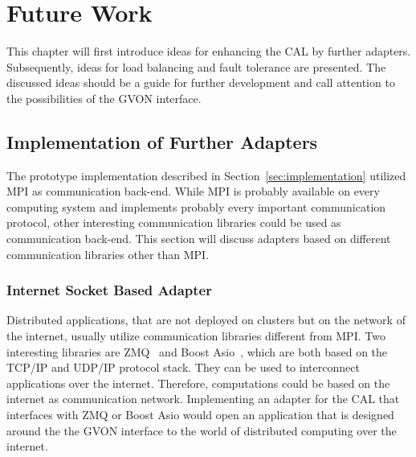 \chapter{Future Work}
\label{sec:futurework}

This chapter will first introduce ideas for enhancing the CAL by
further adapters. Subsequently, ideas for load balancing and fault
tolerance are presented. The discussed ideas should be a guide for
further development and call attention to the possibilities of the
GVON interface.

\section{Implementation of Further Adapters}

The prototype implementation described in
Section~\ref{sec:implementation} utilized MPI as communication
back-end. While MPI is probably available on every computing system
and implements probably every important communication protocol, other
interesting communication libraries could be used as communication
back-end.  This section will discuss adapters based on different
communication libraries other than MPI.

\subsection*{Internet Socket Based Adapter}

Distributed applications, that are not deployed on clusters but on the
network of the internet, usually utilize communication libraries
different from MPI. Two interesting libraries are ZMQ~\cite{ref:zmq}
and Boost Asio~\cite{ref:boost_asio}, which are both based on the
TCP/IP and UDP/IP protocol stack. They can be used to interconnect
applications over the internet. Therefore, computations could be based
on the internet as communication network. Implementing an adapter for
the CAL that interfaces with ZMQ or Boost Asio would open an
application that is designed around the the GVON interface to the world of distributed
computing over the internet.

